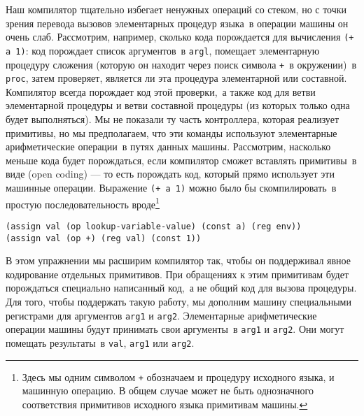 \begin{exercise}{5.38}%
\label{EX5.38}%
Наш компилятор тщательно избегает ненужных операций со
стеком, но с точки зрения перевода вызовов элементарных
процедур языка~в операции машины он очень слаб.
Рассмотрим, например, сколько кода порождается для вычисления {\tt (+
a 1)}: код порождает список аргументов~в {\tt argl},
помещает элементарную процедуру сложения (которую он находит через
поиск символа {\tt +}~в окружении)~в {\tt proc}, затем
проверяет, является ли эта процедура элементарной или составной.
Компилятор всегда порождает код этой проверки,~а также код для ветви
элементарной процедуры и ветви составной процедуры (из которых только
одна будет выполняться).  Мы не показали ту часть контроллера, которая
реализует примитивы, но мы предполагаем, что эти команды используют
элементарные арифметические операции~в путях данных машины.
Рассмотрим, насколько меньше кода будет порождаться, если компилятор
сможет вставлять примитивы~в виде 
 (open coding)
--- то есть порождать код, который прямо использует эти машинные операции.
Выражение {\tt (+ a 1)} можно было бы скомпилировать~в простую
последовательность вроде\footnote{Здесь мы одним символом {\tt +} обозначаем и
процедуру исходного языка, и машинную операцию.  В общем случае может
не быть однозначного соответствия примитивов исходного языка
примитивам машины.
}

\begin{Verbatim}[fontsize=\small]
(assign val (op lookup-variable-value) (const a) (reg env))
(assign val (op +) (reg val) (const 1))
\end{Verbatim}
В этом упражнении мы расширим компилятор так, чтобы он поддерживал
явное кодирование отдельных примитивов.  При обращениях к этим
примитивам будет порождаться специально написанный код,~а не общий код
для вызова процедуры.  Для того, чтобы поддержать такую работу, мы
дополним машину специальными регистрами для аргументов
{\tt arg1} и {\tt arg2}.  Элементарные арифметические
операции машины будут принимать свои аргументы~в {\tt arg1} и
{\tt arg2}.  Они могут помещать результаты~в {\tt val},
{\tt arg1} или {\tt arg2}.


\end{exercise}
